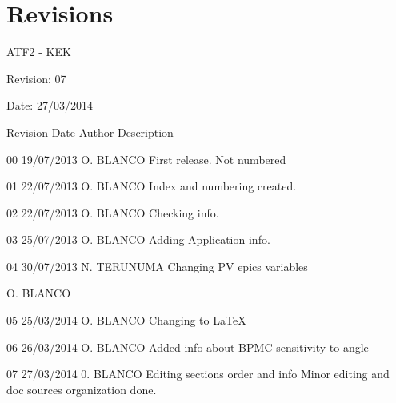 \section{Revisions}
ATF2 - KEK\par
Revision: 07\par
Date: 27/03/2014\par
\vspace*{0.5cm}
Revision	Date			Author		Description\par 
00		19/07/2013	O. BLANCO	First release. Not numbered\par 
01		22/07/2013	O. BLANCO	Index and numbering created.\par 
02		22/07/2013	O. BLANCO	Checking info.\par 
03		25/07/2013	O. BLANCO	Adding Application info.\par 
04		30/07/2013	N. TERUNUMA	Changing PV epics variables\par 
\hspace*{3cm}					O. BLANCO\par 
05		25/03/2014	O. BLANCO	Changing to \LaTeX\par
06		26/03/2014	O. BLANCO	Added info about BPMC sensitivity to angle\par
07		27/03/2014	0. BLANCO	Editing sections order and info
\hspace*{4cm} Minor editing and doc sources organization done.
